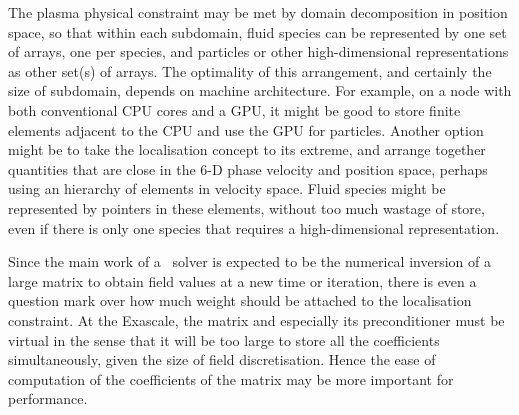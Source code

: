 The plasma physical constraint may be met by domain decomposition in position space,
so that within each subdomain,
fluid species can be represented by one set of arrays, one per species, and particles
or other high-dimensional representations as other set(s) of arrays. The optimality of
this arrangement, and certainly the size of subdomain, depends on machine architecture.
For example, on a node with both conventional CPU cores and a GPU, it might be good to store finite
elements adjacent to the CPU and use the GPU for particles. Another option
might be to take the localisation concept to its extreme, and arrange together quantities that are close
in the 6-D phase velocity and position space, perhaps using an hierarchy of elements in velocity space.
Fluid species might be represented by pointers in these elements, without too much wastage
of store, even if there is only one species that requires a high-dimensional representation.

Since the main work of a \nep\ solver is expected to be the numerical inversion of a
large matrix to obtain field values at a new time or iteration, there is even a question
mark over how much weight should be attached to the localisation constraint. At the Exascale,
the matrix and especially its preconditioner must be virtual in the sense that it will
be too large to store all the coefficients simultaneously, given the size of field discretisation.
Hence the ease
of computation of the coefficients of the matrix may be more important for performance. 



